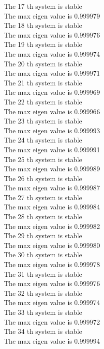 \documentclass[11pt]{article}
\begin{document}
The 17 th system is stable \\
The max eigen value is 0.999979 \\
The 18 th system is stable \\
The max eigen value is 0.999976 \\
The 19 th system is stable \\
The max eigen value is 0.999974 \\
The 20 th system is stable \\
The max eigen value is 0.999971 \\
The 21 th system is stable \\
The max eigen value is 0.999969 \\
The 22 th system is stable \\
The max eigen value is 0.999966 \\
The 23 th system is stable \\
The max eigen value is 0.999993 \\
The 24 th system is stable \\
The max eigen value is 0.999991 \\
The 25 th system is stable \\
The max eigen value is 0.999989 \\
The 26 th system is stable \\
The max eigen value is 0.999987 \\
The 27 th system is stable \\
The max eigen value is 0.999984 \\
The 28 th system is stable \\
The max eigen value is 0.999982 \\
The 29 th system is stable \\
The max eigen value is 0.999980 \\
The 30 th system is stable \\
The max eigen value is 0.999978 \\
The 31 th system is stable \\
The max eigen value is 0.999976 \\
The 32 th system is stable \\
The max eigen value is 0.999974 \\
The 33 th system is stable \\
The max eigen value is 0.999972 \\
The 34 th system is stable \\
The max eigen value is 0.999994 \\
\end{document}
